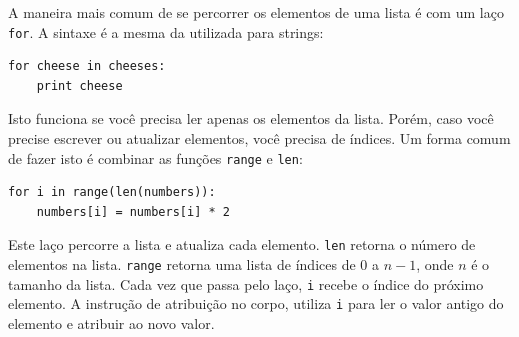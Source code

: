 A maneira mais comum de se percorrer os elementos de uma lista é
com um laço {\tt for}. A sintaxe é a mesma da utilizada para strings:

\beforeverb
\begin{verbatim}
for cheese in cheeses:
    print cheese
\end{verbatim}
\afterverb
%

Isto funciona se você precisa ler apenas os elementos da lista.
Porém, caso você precise escrever ou atualizar elementos, você
precisa de índices. Um forma comum de fazer isto é combinar as
funções {\tt range} e {\tt len}:


\beforeverb
\begin{verbatim}
for i in range(len(numbers)):
    numbers[i] = numbers[i] * 2
\end{verbatim}
\afterverb
%

Este laço percorre a lista e atualiza cada elemento. {\tt len}
retorna o número de elementos na lista. {\tt range} retorna uma
lista de índices de 0 a $n-1$, onde $n$ é o tamanho da lista.
Cada vez que passa pelo laço, {\tt i} recebe o índice do próximo
elemento. A instrução de atribuição no corpo, 
utiliza {\tt i} para ler o valor antigo do elemento e atribuir ao novo valor.

